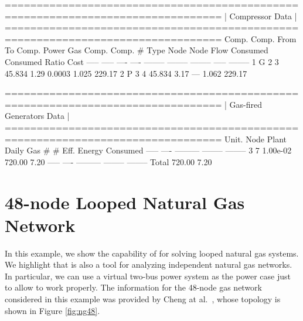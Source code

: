 \begin{small}
	\begin{Code}	
	================================================================================
	|     Compressor Data                                                          |
	================================================================================
	 Comp.   Comp.   From    To     Comp.      Power       Gas      Comp.    Comp.  
	   #     Type    Node   Node    Flow      Consumed   Consumed   Ratio    Cost   
	 -----   -----   ----   ----   --------   --------   --------   -----   --------
	   1       G       2      3      45.834      1.29     0.0003    1.025   229.17
	   2       P       3      4      45.834      3.17       ---     1.062   229.17
	
	================================================================================
	|     Gas-fired Generators Data                                                |
	================================================================================
	 Unit.   Node   Plant       Daily      Gas                               
	   #      #      Eff.       Energy    Consumed                           
	 -----   ----  ---------   --------   --------                           
	   3      7     1.00e-02     720.00      7.20
	 -----   ----  ---------   --------   --------                           
	                   Total     720.00      7.20   	
\end{Code}
\end{small}

\section{48-node Looped Natural Gas Network}
\label{sec:48_gas}

In this example, we show the capability of \mpng{} for solving looped natural gas systems. We highlight that \mpng{} is also a tool for analyzing independent natural gas networks. In particular, we can use a virtual two-bus power system as the power case just to allow \matpower{} to work properly. The information for the 48-node gas network considered in this example was provided by Cheng at al.~\cite{Chen2017}, whose topology is shown in Figure \ref{fig:ng48}.\\

